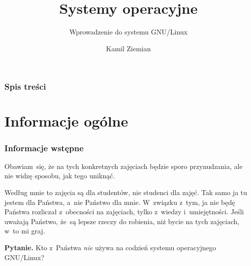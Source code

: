 \documentclass[10pt,t]{beamer}
\title{Systemy operacyjne}
\subtitle{Wprowadzenie do systemu GNU/Linux}
\author{Kamil Ziemian}
\date{}
\begin{document}





\RaggedRight





\maketitle





\begin{frame}
  \frametitle{Spis treści}


  \tableofcontents

\end{frame}





\section{Informacje ogólne}



\begin{frame}
  \frametitle{Informacje wstępne}


  Obawiam~się, że na tych konkretnych zajęciach będzie sporo przynudzania,
  ale nie widzę sposobu, jak tego uniknąć.

  Według mnie to zajęcia są dla studentów, nie studenci dla zajęć. Tak samo
  ja tu jestem dla Państwa, a~nie Państwo dla mnie. W~związku z~tym, ja nie
  będę Państwa rozliczał z~obecności na zajęciach, tylko z~wiedzy
  i~umiejętności. Jeśli uważają Państwo, że~są lepsze rzeczy do robienia,
  niż bycie na tych zajęciach, w~to mi graj.

  \textbf{Pytanie.} Kto z~Państwa \textit{nie} używa na codzień systemu
  operacyjnego GNU/Linux?

\end{frame}
\end{document}
